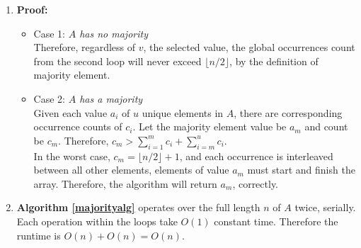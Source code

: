 \documentclass{article}
\begin{document}
\begin{enumerate}[label=(\alph*)]
    \item \textbf{Proof:}
    \begin{itemize}
        \item Case 1: \emph{$A$ has no majority}\\
        Therefore, regardless of $v$, the selected value, the global occurrences count
        from the second loop will never exceed $\lfloor n/2 \rfloor$, by the definition
        of majority element.

        \item Case 2: \emph{$A$ has a majority} \\
        Given each value $a_i$ of $u$ unique elements in $A$, there are corresponding occurrence
        counts of $c_i$. Let the majority element value be $a_m$ and count be $c_m$.
        Therefore, $c_m > \sum_{i=1}^{m} c_i + \sum_{i=m}^{u} c_i$. \\
        In the worst case, $c_m = \lfloor n/2 \rfloor +1$, and each occurrence is interleaved
        between all other elements, elements of value $a_m$ must start and finish the array.
        Therefore, the algorithm will return $a_m$, correctly.        
    \end{itemize}

    \item \textbf{Algorithm \ref{majorityalg}} operates over the full length $n$ of $A$ twice, serially.
    Each operation within the loops take $O(1)$ constant time.
    Therefore the runtime is $O(n) + O(n) = O(n)$.
\end{enumerate}
\end{document}
